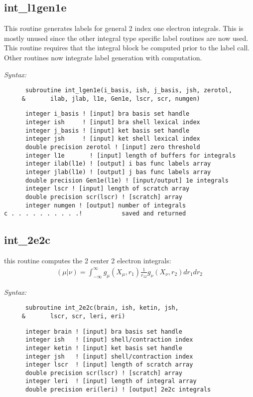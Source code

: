 \subsection{int\_l1gen1e} 
This routine generates labels for general 2 index one  
electron integrals.  This is mostly unused since the other  
integral type specific label routines are now used.  This  
routine requires that the integral block be computed prior  
to the label call.  Other routines now integrate label  
generation with computation.   
 
{\it Syntax:} 
\begin{verbatim} 
      subroutine int_lgen1e(i_basis, ish, j_basis, jsh, zerotol, 
     &       ilab, jlab, l1e, Gen1e, lscr, scr, numgen)  
\end{verbatim} 
\begin{verbatim} 
      integer i_basis ! [input] bra basis set handle 
      integer ish     ! [input] bra shell lexical index 
      integer j_basis ! [input] ket basis set handle 
      integer jsh     ! [input] ket shell lexical index 
      double precision zerotol ! [input] zero threshold 
      integer l1e       ! [input] length of buffers for integrals 
      integer ilab(l1e) ! [output] i bas func labels array 
      integer jlab(l1e) ! [output] j bas func labels array 
      double precision Gen1e(l1e) ! [input/output] 1e integrals 
      integer lscr ! [input] length of scratch array 
      double precision scr(lscr) ! [scratch] array 
      integer numgen ! [output] number of integrals  
c . . . . . . . . . .!           saved and returned 
\end{verbatim} 
\subsection{int\_2e2c} 
this routine computes the 2 center 2 electron integrals:  
\begin{eqnarray*} 
({\mu}|{\nu}) = \int_{-\infty}^{\infty} g_{\mu}(X_{\mu},r_{1})\frac{1}{r_{12}}g_{\nu}(X_{\nu},r_{2})dr_{1}dr_{2} 
\end{eqnarray*} 
 
{\it Syntax:} 
\begin{verbatim} 
      subroutine int_2e2c(brain, ish, ketin, jsh,  
     &       lscr, scr, leri, eri) 
\end{verbatim} 
\begin{verbatim} 
      integer brain ! [input] bra basis set handle 
      integer ish   ! [input] shell/contraction index 
      integer ketin ! [input] ket basis set handle 
      integer jsh   ! [input] shell/contraction index 
      integer lscr  ! [input] length of scratch array 
      double precision scr(lscr) ! [scratch] array 
      integer leri  ! [input] length of integral array 
      double precision eri(leri) ! [output] 2e2c integrals 
\end{verbatim} 

